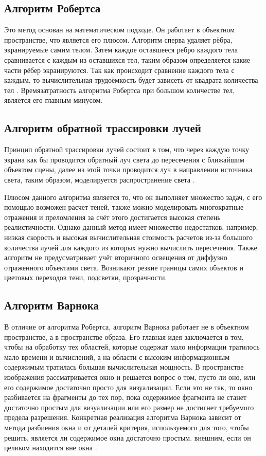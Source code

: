 \documentclass[a4paper,14pt]{report}
\begin{document}
\subsection{Алгоритм Робертса}
\par
Это метод основан на математическом подходе. Он работает в объектном пространстве, что является его плюсом. Алгоритм сперва удаляет рёбра, экранируемые самим телом. Затем каждое оставшееся ребро каждого тела сравнивается с каждым из оставшихся тел, таким образом определяется какие части рёбер экранируются. Так как происходит сравнение каждого тела с каждым, то вычислительная трудоёмкость будет зависеть от квадрата количества тел \cite{alg}. Времязатратность алгоритма Робертса при большом количестве тел, является его главным минусом.

\subsection{Алгоритм обратной трассировки лучей }
\par
Принцип обратной трассировки лучей состоит в том, что через каждую точку экрана как бы проводится обратный луч света до пересечения с ближайшим объектом сцены, далее из этой точки проводится луч в направлении источника света, таким образом, моделируется распространение света \cite{alg}.

Плюсом данного алгоритма является то, что он выполняет множество задач, с его помощью возможен расчет теней, также можно моделировать многократные отражения и преломления за счёт этого достигается высокая степень реалистичности.
Однако данный метод имеет множество недостатков, например, низкая скорость и высокая вычислительная стоимость расчетов из-за большого количества лучей для каждого из которых нужно вычислить пересечения.
Также алгоритм не предусматривает учёт вторичного освещения от диффузно отраженного объектами света.
Возникают резкие границы самих объектов и цветовых переходов тени, подсветки, прозрачности.

\subsection{Алгоритм Варнока}
\par
В отличие от алгоритма Робертса, алгоритм Варнока работает не в объектном пространстве, а в пространстве образа. Его главная идея заключается в том, чтобы на обработку тех областей, которые содержат мало информации тратилось мало времени и вычислений, а на области с высоким информационным содержимым тратилась большая вычислительная мощность. 
В пространстве изображения рассматривается окно и решается вопрос о том, пусто ли оно, или его содержимое достаточно просто для визуализации. Если это не так, то окно разбивается на фрагменты до тех пор, пока содержимое фрагмента не станет достаточно простым для визуализации или его размер не достигнет требуемого предела разрешения. 
Конкретная реализация алгоритма Варнока зависит от метода разбиения окна и от деталей критерия, используемого для того, чтобы решить, является ли содержимое окна достаточно простым. внешним, если он целиком находится вне окна \cite{alg}.
\end{document}
